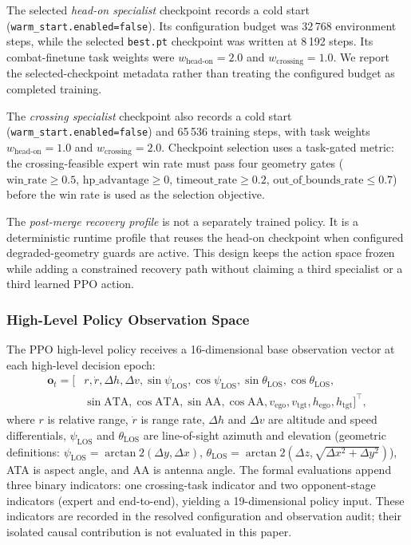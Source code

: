 \documentclass[5p,times]{elsarticle} %
\begin{document}
The selected \emph{head-on specialist} checkpoint records a cold start (\texttt{warm\_start.enabled=false}). Its configuration budget was 32\,768 environment steps, while the selected \texttt{best.pt} checkpoint was written at 8\,192 steps. Its combat-finetune task weights were $w_{\text{head-on}}=2.0$ and $w_{\text{crossing}}=1.0$. We report the selected-checkpoint metadata rather than treating the configured budget as completed training.

The \emph{crossing specialist} checkpoint also records a cold start (\texttt{warm\_start.enabled=false}) and 65\,536 training steps, with task weights $w_{\text{head-on}}=1.0$ and $w_{\text{crossing}}=2.0$. Checkpoint selection uses a task-gated metric: the crossing-feasible expert win rate must pass four geometry gates ($\text{win\_rate}\ge 0.5$, $\text{hp\_advantage}\ge 0$, $\text{timeout\_rate}\ge 0.2$, $\text{out\_of\_bounds\_rate}\le 0.7$) before the win rate is used as the selection objective.

The \emph{post-merge recovery profile} is not a separately trained policy. It is a deterministic runtime profile that reuses the head-on checkpoint when configured degraded-geometry guards are active. This design keeps the action space frozen while adding a constrained recovery path without claiming a third specialist or a third learned PPO action.

\subsubsection{High-Level Policy Observation Space}

The PPO high-level policy receives a 16-dimensional base observation vector at each high-level decision epoch:
\begin{equation}
\begin{split}
\mathbf{o}_t = [&r, \dot{r}, \Delta h, \Delta v, \sin\psi_{\text{LOS}}, \cos\psi_{\text{LOS}}, \sin\theta_{\text{LOS}}, \cos\theta_{\text{LOS}}, \\
&\sin\text{ATA}, \cos\text{ATA}, \sin\text{AA}, \cos\text{AA}, v_{\text{ego}}, v_{\text{tgt}}, h_{\text{ego}}, h_{\text{tgt}}]^\top,
\end{split}
\end{equation}
where $r$ is relative range, $\dot{r}$ is range rate, $\Delta h$ and $\Delta v$ are altitude and speed differentials, $\psi_{\text{LOS}}$ and $\theta_{\text{LOS}}$ are line-of-sight azimuth and elevation (geometric definitions: $\psi_{\text{LOS}} = \arctan2(\Delta y, \Delta x)$, $\theta_{\text{LOS}} = \arctan2(\Delta z, \sqrt{\Delta x^2 + \Delta y^2})$), ATA is aspect angle, and AA is antenna angle. The formal evaluations append three binary indicators: one crossing-task indicator and two opponent-stage indicators (expert and end-to-end), yielding a 19-dimensional policy input. These indicators are recorded in the resolved configuration and observation audit; their isolated causal contribution is not evaluated in this paper.
\end{document}
